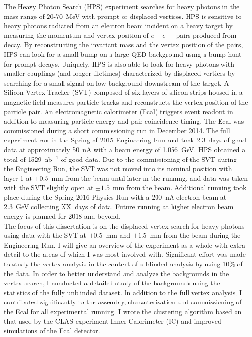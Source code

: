 \documentclass[12pt]{report}
\begin{document}
The Heavy Photon Search (HPS) experiment searches for heavy photons in the mass range of 20-70~MeV with prompt or displaced vertices. HPS is sensitive to heavy photons radiated from an electron beam incident on a heavy target by measuring the momentum and vertex position of $e+e-$ pairs produced from decay. By reconstructing the invariant mass and the vertex position of the pairs, HPS can look for a small bump on a large QED background using a bump hunt for prompt decays. Uniquely, HPS is also able to look for heavy photons with smaller couplings (and longer lifetimes) characterized by displaced vertices by searching for a small signal on low background downstream of the target. A Silicon Vertex Tracker (SVT) composed of six layers of silicon strips housed in a magnetic field measures particle tracks and reconstructs the vertex position of the particle pair. An electromagnetic calorimeter (Ecal) triggers event readout in addition to measuring particle energy and pair coincidence timing. The Ecal was commissioned during a short commissioning run in December 2014. The full experiment ran in the Spring of 2015 Engineering Run and took 2.3~days of good data at approximately 50~nA with a beam energy of 1.056~GeV. HPS obtained a total of 1529~nb$^{-1}$ of good data. Due to the commissioning of the SVT during the Engineering Run, the SVT was not moved into its nominal position with layer 1 at $\pm0.5$~mm from the beam until later in the running, and data was taken with the SVT slightly open at $\pm1.5$~mm from the beam.  Additional running took place during the Spring 2016 Physics Run with a 200~nA electron beam at 2.3~GeV collecting XX~days of data.  Future running at higher electron beam energy is planned for 2018 and beyond.\\
The focus of this dissertation is on the displaced vertex search for heavy photons using data with the SVT at $\pm0.5$~mm and $\pm1.5$~mm from the beam during the Engineering Run. I will give an overview of the experiment as a whole with extra detail to the areas of which I was most involved with. Significant effort was made to study the vertex analysis in the context of a blinded analysis by using 10$\%$ of the data. In order to better understand and analyze the backgrounds in the vertex search, I conducted a detailed study of the backgrounds using the statistics of the fully unblinded dataset. In addition to the full vertex analysis, I contributed significantly to the assembly, characterization and commissioning of the Ecal for all experimental running. I wrote the clustering algorithm based on that used by the CLAS experiment Inner Calorimeter (IC) and improved simulations of the Ecal detector. 
\end{document}
